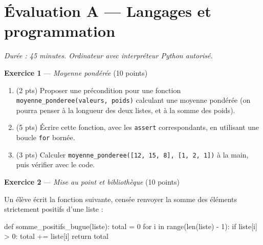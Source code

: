 \section*{Évaluation A --- Langages et programmation}
\textit{Durée : 45 minutes. Ordinateur avec interpréteur Python autorisé.}


\bigskip

\textbf{Exercice 1} --- \textit{Moyenne pondérée} \hfill (10 points)

\begin{enumerate}
  \item (2 pts) Proposer une précondition pour une fonction \lstinline{moyenne_ponderee(valeurs, poids)} calculant une moyenne pondérée (on pourra penser à la longueur des deux listes, et à la somme des poids).
  \item (5 pts) Écrire cette fonction, avec les \lstinline{assert} correspondants, en utilisant une boucle \lstinline{for} bornée.
  \item (3 pts) Calculer \lstinline{moyenne_ponderee([12, 15, 8], [1, 2, 1])} à la main, puis vérifier avec le code.
\end{enumerate}


\bigskip

\textbf{Exercice 2} --- \textit{Mise au point et bibliothèque} \hfill (10 points)

Un élève écrit la fonction suivante, censée renvoyer la somme des éléments strictement
positifs d'une liste :
\begin{python}
def somme_positifs_bugue(liste):
    total = 0
    for i in range(len(liste) - 1):
        if liste[i] > 0:
            total += liste[i]
    return total
\end{python}

